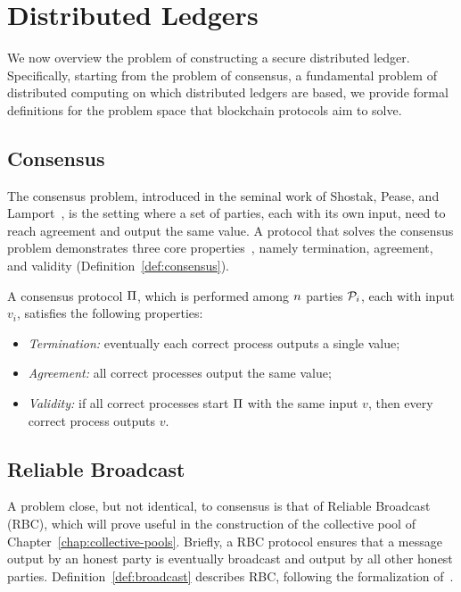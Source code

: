 \section{Distributed Ledgers}

We now overview the problem of constructing a secure distributed ledger.
Specifically, starting from the problem of consensus, a fundamental problem of
distributed computing on which distributed ledgers are based, we provide formal
definitions for the problem space that blockchain protocols aim to solve.

\subsection{Consensus}

The consensus problem, introduced in the seminal work of Shostak, Pease, and
Lamport~\cite{lamport1982byzantine,pease1980reaching}, is the setting where a
set of parties, each with its own input, need to reach agreement and output the
same value. A protocol that solves the consensus problem demonstrates three
core properties~\cite{koulouris2002distributed}, namely termination, agreement,
and validity (Definition~\ref{def:consensus}).

\begin{definition}[Consensus]\label{def:consensus}
    A consensus protocol $\Pi$, which is performed among $n$
    parties $\mathcal{P}_i$, each with input $v_i$, satisfies the following
    properties:
    \begin{itemize}
        \item \emph{Termination:} eventually each correct process outputs a
            single value;
        \item \emph{Agreement:} all correct processes output the same value;
        \item \emph{Validity:} if all correct processes start $\Pi$
            with the same input $v$, then every correct process outputs $v$.
    \end{itemize}
\end{definition}

\subsection{Reliable Broadcast}

A problem close, but not identical, to consensus is that of Reliable Broadcast
(RBC), which will prove useful in the construction of the collective pool of
Chapter~\ref{chap:collective-pools}. Briefly, a RBC protocol ensures that a
message output by an honest party is eventually broadcast and output by all
other honest parties. Definition~\ref{def:broadcast} describes RBC, following
the formalization of~\cite{PODC:CJKR12,cryptoeprint:2021:671}.

